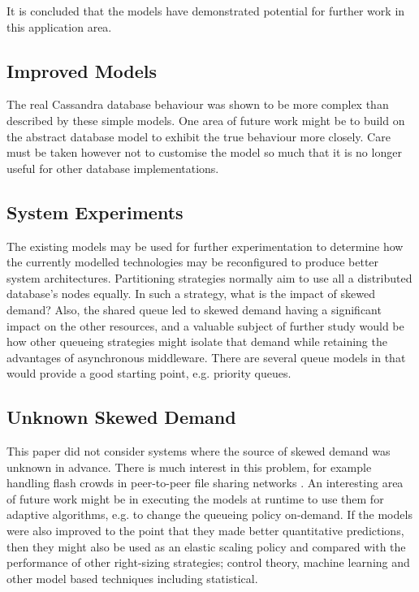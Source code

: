 \documentclass[runningheads]{llncs}
\begin{document}
It is concluded that the models have demonstrated potential for further work in this application area.

\subsection{Improved Models}

The real Cassandra database behaviour was shown to be more complex than described by these simple models.  One area of future work might be to build on the abstract database model to exhibit the true behaviour more closely.  Care must be taken however not to customise the model so much that it is no longer useful for other database implementations.

\subsection{System Experiments}

The existing models may be used for further experimentation to determine how the currently modelled technologies may be reconfigured to produce better system architectures.  Partitioning strategies normally aim to use all a distributed database's nodes equally.  In such a strategy, what is the impact of skewed demand?  Also, the shared queue led to skewed demand having a significant impact on the other resources, and a valuable subject of further study would be how other queueing strategies might isolate that demand while retaining the advantages of asynchronous middleware.  There are several queue models in \cite{RN75} that would provide a good starting point, e.g. priority queues.

\subsection{Unknown Skewed Demand}
This paper did not consider systems where the source of skewed demand was unknown in advance.  There is much interest in this problem, for example handling flash crowds in peer-to-peer file sharing networks \cite{RN230}.
An interesting area of future work might be in executing the models at runtime to use them for adaptive algorithms, e.g. to change the queueing policy on-demand.  If the models were also improved to the point that they made better quantitative predictions, then they might also be used as an elastic scaling policy and compared with the performance of other right-sizing strategies; control theory, machine learning and other model based techniques including statistical.
\end{document}
